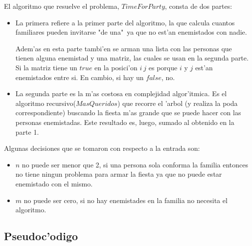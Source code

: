 El algoritmo que resuelve el problema, $TimeForParty$, consta de dos partes:
\begin{itemize}
\item La primera refiere a la primer parte del algoritmo, la que calcula cuantos familiares pueden invitarse "de una"\ ya que no est'an enemistados con nadie.

Adem'as en esta parte tambi'en se arman una lista con las personas que tienen alguna enemistad y una matriz, las cuales se usan en la segunda parte. Si la matriz tiene un $true$ en la posici'on $i\ j$ es porque $i$ y $j$ est'an enemistados entre si. En cambio, si hay un $false$, no.

\item La segunda parte es la m'as costosa en complejidad algor'itmica. Es el algoritmo recursivo($MasQueridos$) que recorre el 'arbol (y realiza la poda correspondiente) buscando la fiesta m'as grande que se puede hacer con las personas enemistadas. Este resultado es, luego, sumado al obtenido en la parte 1.

\end{itemize}

Algunas decisiones que se tomaron con respecto a la entrada son:
\begin{itemize}
\item $n$ no puede ser menor que 2, si una persona sola conforma la familia entonces no tiene ningun problema para armar la fiesta ya que no puede estar enemistado con el mismo.
\item $m$ no puede ser cero, si no hay enemistades en la familia no necesita el algoritmo.
\end{itemize}


\subsection{Pseudoc'odigo}

